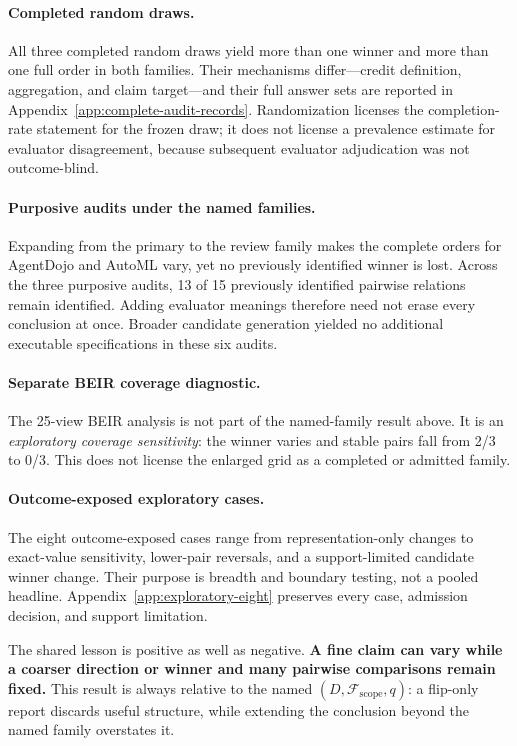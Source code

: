 \documentclass{article}
\newcommand{\F}{\mathcal F}
\begin{document}
\paragraph{Completed random draws.}
All three completed random draws yield more than one winner and more than one full order in both families.  Their mechanisms differ---credit definition, aggregation, and claim target---and their full answer sets are reported in Appendix~\ref{app:complete-audit-records}.  Randomization licenses the completion-rate statement for the frozen draw; it does not license a prevalence estimate for evaluator disagreement, because subsequent evaluator adjudication was not outcome-blind.

\paragraph{Purposive audits under the named families.}
Expanding from the primary to the review family makes the complete orders for AgentDojo and AutoML vary, yet no previously identified winner is lost.  Across the three purposive audits, 13 of 15 previously identified pairwise relations remain identified.  Adding evaluator meanings therefore need not erase every conclusion at once.  Broader candidate generation yielded no additional executable specifications in these six audits.

\paragraph{Separate BEIR coverage diagnostic.}
The 25-view BEIR analysis is not part of the named-family result above.  It is an \emph{exploratory coverage sensitivity}: the winner varies and stable pairs fall from 2/3 to 0/3.  This does not license the enlarged grid as a completed or admitted family.

\paragraph{Outcome-exposed exploratory cases.}
The eight outcome-exposed cases range from representation-only changes to exact-value sensitivity, lower-pair reversals, and a support-limited candidate winner change.  Their purpose is breadth and boundary testing, not a pooled headline.  Appendix~\ref{app:exploratory-eight} preserves every case, admission decision, and support limitation.

The shared lesson is positive as well as negative.  \textbf{A fine claim can vary while a coarser direction or winner and many pairwise comparisons remain fixed.}  This result is always relative to the named \((D,\F_{\mathrm{scope}},q)\): a flip-only report discards useful structure, while extending the conclusion beyond the named family overstates it.
\end{document}
